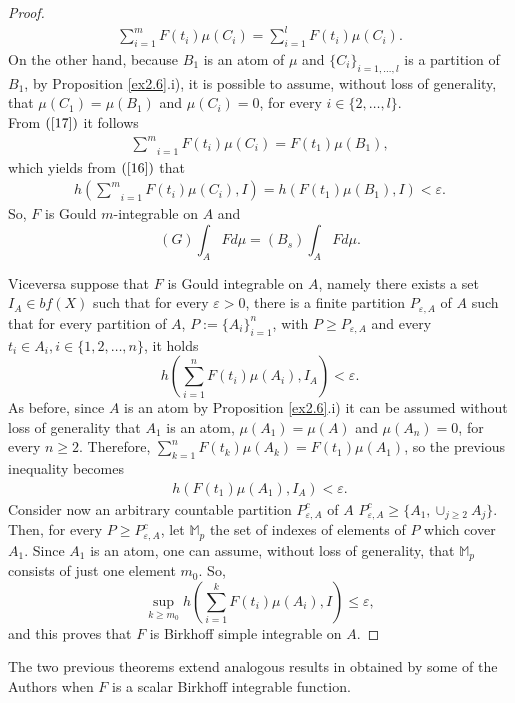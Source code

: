 \documentclass[11pt,a4paper,twoside]{amsart}
\begin{document}
\begin{proof}
\begin{eqnarray}
\sum_{i=1}^m F(t_{i})\mu (C_{i})=\sum_{i=1}^l F(t_{i})\mu (C_{i}).
\end{eqnarray}
On the other hand, because $B_{1}$ is an atom of $\mu $ and $\{C_{i}\}_{i=1, \ldots, l}$ is a partition of $B_{1}$, by 
Proposition \ref{ex2.6}.i), 
it is possible to assume, without loss of generality, 
that $\mu (C_{1})=\mu (B_{1})$ and $\mu (C_{i})=0$, for every $i\in\{2,\ldots, l\}.$\\ 
From $(\ref{17})$ it follows 
\begin{eqnarray*}
\underset{i=1}{\overset{m}{\sum }}F(t_{i})\mu (C_{i})=F(t_{1})\mu (B_{1}),
\end{eqnarray*}
which yields from $(\ref{16})$ that 
\begin{eqnarray*}
h(\underset{i=1}{\overset{m}{\sum }}F(t_{i})\mu (C_{i}),I)=h(F(t_{1})\mu
(B_{1}),I)<\varepsilon .
\end{eqnarray*}
So, $F$ is Gould $m$-integrable on $A$ and 
$$(G)\int_{A}Fd\mu
=(B_s)\int_{A}Fd\mu .$$

Viceversa suppose that $F$ is Gould integrable on $A$, namely 
 there exists a set $I_A \in bf(X)$ such that for every 
$\varepsilon >0$, there is a finite partition $P_{\varepsilon, A }$ of 
$A$ such that for every partition of $A$, $P:=\{A_{i}\}_{i=1}^{n}$, with $P\geq P_{\varepsilon,A }$ and
every $t_{i}\in A_{i},i\in \{1,2,\ldots,n\}$, it holds
$$h(\sum_{i=1}^n F(t_{i})\mu (A_{i}),I_A)<\varepsilon.$$
As before, since $A$ is an atom by Proposition \ref{ex2.6}.i) it can be assumed
without  loss of generality that $A_1$ is an atom,
 $\mu (A_{1})=\mu (A)$ and $\mu(A_{n})=0$, for every $n\geq 2.$
Therefore, 
$\sum_{k=1}^n F(t_{k})\mu (A_{k})=F(t_{1})\mu (A_{1})$, so the previous inequality becomes 
\begin{eqnarray*}\label{16bis}
h(F(t_{1})\mu (A_{1}),I_A) <\varepsilon .
\end{eqnarray*}
Consider now an arbitrary countable partition $P^c_{\varepsilon, A}$ of $A$ 
$P^c_{\varepsilon, A} \geq \{A_1, \cup_{j \geq 2} A_j\}$.
Then, for every $P \geq P^c_{\varepsilon, A}$, let $\mathbb{M}_p$ the set of indexes of elements of $P$  which cover $A_1$. Since $A_1$ is an atom, one can assume, without loss of generality, that $\mathbb{M}_p$ consists of just one element $m_0$.
So,
$$\sup_{k\geq m_0}h\left(\sum_{i=1}^kF(t_i)\mu(A_i),I\right)\leq {\varepsilon},$$
and this proves that $F$  is Birkhoff simple
integrable on $A$.
\end{proof}
The two previous theorems extend analogous results  in \cite{cg2014}  obtained by some of the Authors when $F$ is a scalar   Birkhoff integrable function.
\\
\end{document}
